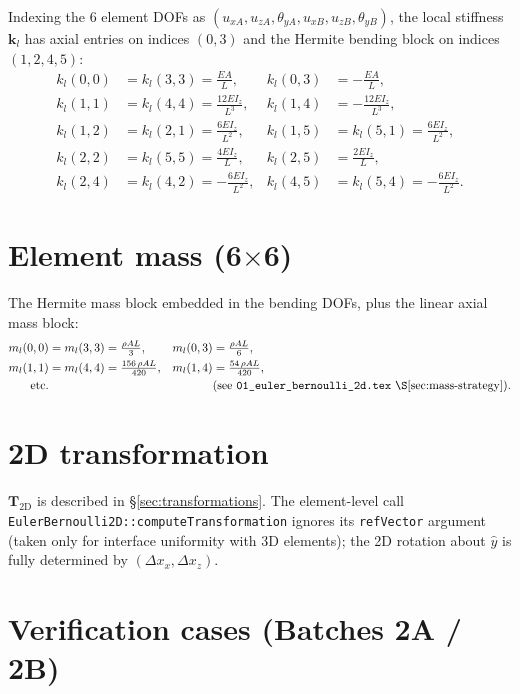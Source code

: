 \documentclass[11pt,a4paper]{book}
\newcommand{\bmath}[1]{\boldsymbol{#1}}
\newcommand{\yhat}{\hat{y}}
\begin{document}
Indexing the 6 element DOFs as $(u_{xA}, u_{zA}, \theta_{yA}, u_{xB}, u_{zB}, \theta_{yB})$, the local stiffness $\bmath{k}_l$ has axial entries on indices $(0, 3)$ and the Hermite bending block on indices $(1, 2, 4, 5)$:
\begin{align*}
k_l(0,0) &= k_l(3,3) = \tfrac{EA}{L}, & k_l(0,3) &= -\tfrac{EA}{L}, \\
k_l(1,1) &= k_l(4,4) = \tfrac{12 E I_z}{L^3}, & k_l(1,4) &= -\tfrac{12 E I_z}{L^3}, \\
k_l(1,2) &= k_l(2,1) = \tfrac{6 E I_z}{L^2}, & k_l(1,5) &= k_l(5,1) = \tfrac{6 E I_z}{L^2}, \\
k_l(2,2) &= k_l(5,5) = \tfrac{4 E I_z}{L},   & k_l(2,5) &= \tfrac{2 E I_z}{L}, \\
k_l(2,4) &= k_l(4,2) = -\tfrac{6 E I_z}{L^2},& k_l(4,5) &= k_l(5,4) = -\tfrac{6 E I_z}{L^2}.
\end{align*}

\section{Element mass (6\texorpdfstring{$\times$}{x}6)}

The Hermite mass block embedded in the bending DOFs, plus the linear axial mass block:
\begin{align*}
m_l(0,0) &= m_l(3,3) = \tfrac{\rho A L}{3}, & m_l(0,3) &= \tfrac{\rho A L}{6}, \\
m_l(1,1) &= m_l(4,4) = \tfrac{156\,\rho A L}{420}, & m_l(1,4) &= \tfrac{54\,\rho A L}{420}, \\
\text{etc.} & & & \text{(see \texttt{01\_euler\_bernoulli\_2d.tex} \S\ref{sec:mass-strategy}).}
\end{align*}

\section{2D transformation}

$\bmath{T}_{\text{2D}}$ is described in \S\ref{sec:transformations}. The element-level call \texttt{EulerBernoulli2D::computeTransformation} ignores its \texttt{refVector} argument (taken only for interface uniformity with 3D elements); the 2D rotation about $\yhat$ is fully determined by $(\Delta x_x, \Delta x_z)$.

\section{Verification cases (Batches 2A / 2B)}\label{sec:eb2d-verification}
\end{document}
